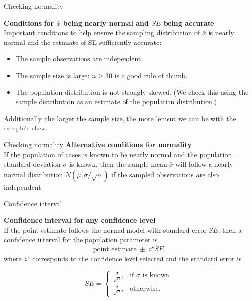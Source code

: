 \documentclass[12pt,a4paper]{beamer}
\begin{document}
\begin{frame}{Checking normality}
	\begin{framed}
		\textbf{Conditions for $\bar{x}$ being nearly normal and $SE$ being accurate}\\
	Important conditions to help ensure the sampling distribution of $\bar{x}$ is nearly normal and the estimate of SE sufficiently accurate:
	\begin{itemize}
	\setlength{\itemsep}{0mm}
	\item The sample observations are independent.
	\item The sample size is large: $n\geq30$ is a good rule of thumb.
	\item The population distribution is not strongly skewed. (We check this using the sample distribution as an estimate of the population distribution.)
	\end{itemize}
	Additionally, the larger the sample size, the more lenient we can be with the sample's skew.
\end{framed}
\end{frame}
\begin{frame}{Checking normality}
	\textbf{Alternative conditions for normality}\\
	If the population of cases is known to be nearly normal and the population standard deviation $\sigma$ is known, then the sample mean $\bar{x}$ will follow a nearly normal distribution $N(\mu, \sigma/\sqrt{n})$ if the sampled observations are also independent.
\end{frame}
\begin{frame}{Confidence interval}
	\begin{framed}
\textbf{Confidence interval for any confidence level}\\
If the point estimate follows the normal model with standard error $SE$, then a confidence interval for the population parameter is
\begin{eqnarray*}
\text{point estimate}\ \pm\ z^{\star} SE
\end{eqnarray*}
where $z^{\star}$ corresponds to the confidence level selected and the standard error is

\[SE=\left\lbrace\begin{array}{lc}
\frac{\sigma}{\sqrt{n}},& \text{if $\sigma$ is known}\\
\frac{s}{\sqrt{n}},& \text{otherwise.}

\end{array}\right.\]

\end{framed}
\end{frame}
\end{document}
